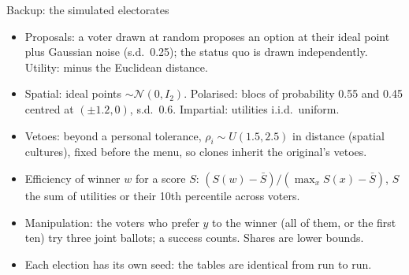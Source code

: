 \documentclass[10pt,aspectratio=169]{beamer}
\begin{document}
\begin{frame}{Backup: the simulated electorates}
  \begin{itemize}\small
    \item Proposals: a voter drawn at random proposes an option at their ideal point plus Gaussian noise
      (s.d.\ 0.25); the status quo is drawn independently. Utility: minus the Euclidean distance.
    \item Spatial: ideal points $\sim \mathcal{N}(0, I_2)$. Polarised: blocs of probability 0.55 and 0.45
      centred at $(\pm 1.2, 0)$, s.d.\ 0.6. Impartial: utilities i.i.d.\ uniform.
    \item Vetoes: beyond a personal tolerance, $\rho_i \sim U(1.5, 2.5)$ in distance (spatial cultures),
      fixed before the menu, so clones inherit the original's vetoes.
    \item Efficiency of winner $w$ for a score $S$: $(S(w) - \bar S)/(\max_x S(x) - \bar S)$, $S$ the sum of
      utilities or their 10th percentile across voters.
    \item Manipulation: the voters who prefer $y$ to the winner (all of them, or the first ten) try three
      joint ballots; a success counts. Shares are lower bounds.
    \item Each election has its own seed: the tables are identical from run to run.
  \end{itemize}
\end{frame}
\end{document}
